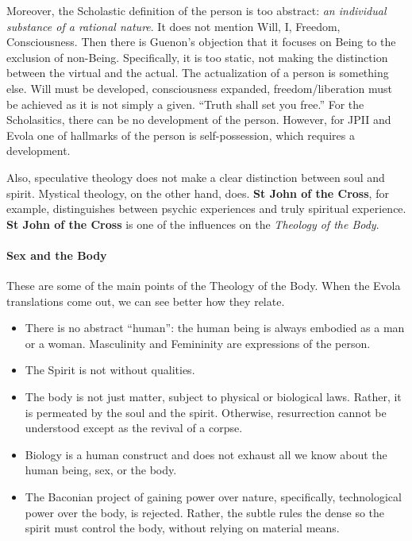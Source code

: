 Moreover, the Scholastic definition of the person is too abstract: \emph{an individual substance of a rational nature}. It does not mention Will, I, Freedom, Consciousness. Then there is Guenon's objection that it focuses on Being to the exclusion of non-Being. Specifically, it is too static, not making the distinction between the virtual and the actual. The actualization of a person is something else. Will must be developed, consciousness expanded, freedom/liberation must be achieved as it is not simply a given. ``Truth shall set you free.'' For the Scholasitics, there can be no development of the person. However, for JPII and Evola one of hallmarks of the person is self-possession, which requires a development.

Also, speculative theology does not make a clear distinction between soul and spirit. Mystical theology, on the other hand, does. \textbf{St John of the Cross}, for example, distinguishes between psychic experiences and truly spiritual experience. \textbf{St John of the Cross} is one of the influences on the \textit{Theology of the Body}.

\paragraph{Sex and the Body}


These are some of the main points of the Theology of the Body. When the Evola translations come out, we can see better how they relate.

\begin{itemize}


\item There is no abstract ``human'': the human being is always embodied as a man or a woman. Masculinity and Femininity are expressions of the person.

\item The Spirit is not without qualities.

\item The body is not just matter, subject to physical or biological laws. Rather, it is permeated by the soul and the spirit. Otherwise, resurrection cannot be understood except as the revival of a corpse.

\item Biology is a human construct and does not exhaust all we know about the human being, sex, or the body.

\item The Baconian project of gaining power over nature, specifically, technological power over the body, is rejected. Rather, the subtle rules the dense so the spirit must control the body, without relying on material means.
\end{itemize}


